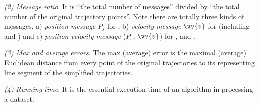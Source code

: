 { \ni \emph{(2) Message ratio}. It is ``the total number of messages'' divided by ``the total number of the original trajectory points''. Note there are totally three kinds of messages, \ie a) \emph{position-message} $P_s$ for \grts, b) \emph{velocity-message} $\vv{v}$ for \bitt (including \citt and \sitt) and c) \emph{position-velocity-message} ($P_s$, $\vv{v}$) for \ldrh, \grts and \bitt. 
 

 \ni \emph{(3) Max and average errors}. The max (average) error is the maximal (average) Euclidean distance from every point of the original trajectories to its representing line segment of the simplified trajectories.
 
 \ni \emph{(4) Running time}. It is the essential execution time of an algorithm in processing a dataset.
 



}
